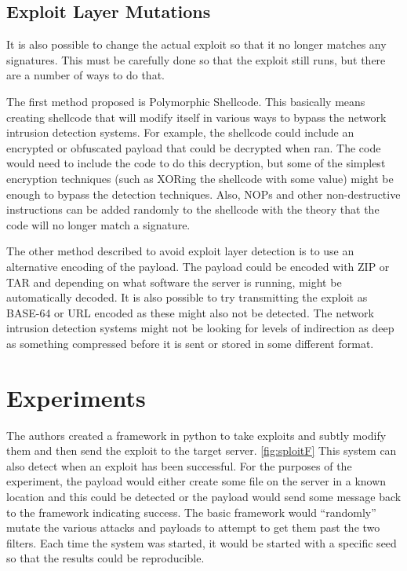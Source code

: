 \documentclass{reading_glasses}
\begin{document}
\subsection{Exploit Layer Mutations}
It is also possible to change the actual exploit so that it no longer matches any signatures.  This must be carefully done so that the exploit still runs, but there are a number of ways to do that.  

The first method proposed is Polymorphic Shellcode.  This basically means creating shellcode that will modify itself in various ways to bypass the network intrusion detection systems.  For example, the shellcode could include an encrypted or obfuscated payload that could be decrypted when ran.  The code would need to include the code to do this decryption, but some of the simplest encryption techniques (such as XORing the shellcode with some value) might be enough to bypass the detection techniques.  Also, NOPs and other non-destructive instructions can be added randomly to the shellcode with the theory that the code will no longer match a signature.  

The other method described to avoid exploit layer detection is to use an alternative encoding of the payload.  The payload could be encoded with ZIP or TAR and depending on what software the server is running, might be automatically decoded.  It is also possible to try transmitting the exploit as BASE-64 or URL encoded as these might also not be detected.  The network intrusion detection systems might not be looking for levels of indirection as deep as something compressed before it is sent or stored in some different format.

\section{Experiments}
The authors created a framework in python to take exploits and subtly modify them and then send the exploit to the target server. \ref{fig:sploitF}  This system can also detect when an exploit has been successful.  For the purposes of the experiment, the payload would either create some file on the server in a known location and this could be detected or the payload would send some message back to the framework indicating success. The basic framework would “randomly” mutate the various attacks and payloads to attempt to get them past the two filters.  Each time the system was started, it would be started with a specific seed so that the results could be reproducible.
\end{document}

